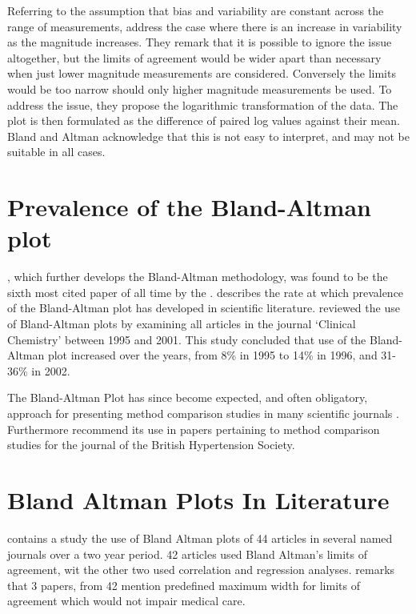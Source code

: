 \documentclass[12pt, a4paper]{report}
\theoremstyle{plain}
\theoremstyle{definition}
\theoremstyle{remark}
\begin{document}
		Referring to the assumption that bias and variability are constant across the range
		of measurements, \citet{BA99} address the case where there is an increase in variability as the magnitude increases. They remark 	that it is possible to ignore the issue altogether, but the limits of agreement would be wider apart than necessary when just lower magnitude measurements are considered. Conversely the limits would be too narrow should only higher magnitude measurements be used.	To address the issue, they propose the logarithmic transformation of the data. The plot is then formulated as the difference of paired log values against their mean. Bland and Altman acknowledge that this is not easy to interpret, and may not be suitable in all cases.


	\section{Prevalence of the Bland-Altman plot}
	
	\citet*{BA86}, which further develops the Bland-Altman methodology,
	was found to be the sixth most cited paper of all time by the
	\citet{BAcite}. \cite{Dewitte} describes the rate at which
	prevalence of the Bland-Altman plot has developed in scientific
	literature. \citet{Dewitte} reviewed the use of Bland-Altman plots
	by examining all articles in the journal `Clinical Chemistry'
	between 1995 and 2001. This study concluded that use of the
	Bland-Altman plot increased over the years, from 8\% in 1995 to
	14\% in 1996, and 31-36\% in 2002.
	
	The Bland-Altman Plot has since become expected, and
	often obligatory, approach for presenting method comparison
	studies in many scientific journals \citep{hollis}. Furthermore
	\citet{BritHypSoc} recommend its use in papers pertaining to
	method comparison studies for the journal of the British
	Hypertension Society.
	

	\section{Bland Altman Plots In Literature}
	\citet{mantha} contains a study the use of Bland Altman plots of
	44 articles in several named journals over a two year period. 42
	articles used Bland Altman's limits of agreement, wit the other
	two used correlation and regression analyses. \citet{mantha}
	remarks that 3 papers, from 42 mention predefined maximum width
	for limits of agreement which would not impair medical care.
	
\end{document}
